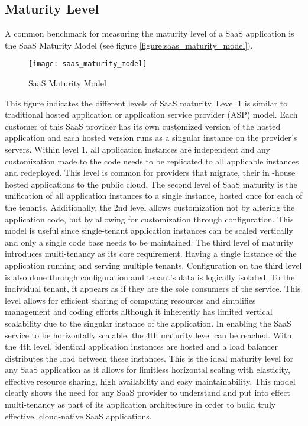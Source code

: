\subsection{Maturity Level}

A common benchmark for measuring the maturity level of a SaaS application is the SaaS Maturity Model (see figure \ref{figure:saas_maturity_model}).


\begin{figure}
\centering
\texttt{[image: saas\_maturity\_model]}
\caption{SaaS Maturity Model}
\label{saas_maturity_model}
\end{figure}


This figure indicates the different levels of SaaS maturity. Level 1 is similar to traditional hosted application or application service provider (ASP) model. Each customer of this SaaS provider has its own customized version of the hosted application and each hosted version runs as a singular instance on the provider's servers. Within level 1, all application instances are independent and any customization made to the code needs to be replicated to all applicable instances and redeployed. This level is common for providers that migrate, their in -house hosted applications to the public cloud. The second level of SaaS maturity is the unification of all application instances to a single instance, hosted once for each of the tenants. Additionally, the 2nd level allows customization not by altering the application code, but by allowing for customization through configuration. This model is useful since single-tenant application instances can be scaled vertically and only a single code base needs to be maintained. The third level of maturity introduces multi-tenancy as its core requirement. Having a single instance of the application running and serving multiple tenants. Configuration on the third level is also done through configuration and tenant's data is logically isolated. To the individual tenant, it appears as if they are the sole consumers of the service. This level allows for efficient sharing of computing resources and simplifies management and coding efforts although it inherently has limited vertical scalability due to the singular instance of the application. In enabling the SaaS service to be horizontally scalable, the 4th maturity level can be reached. With the 4th level, identical application instances are hosted and a load balancer distributes the load between these instances. This is the ideal maturity level for any SaaS application as it allows for limitless horizontal scaling with elasticity, effective resource sharing, high availability  and easy maintainability. This model clearly shows the need for any SaaS provider to understand and put into effect multi-tenancy as part of its application architecture in order to build truly effective, cloud-native SaaS applications.

